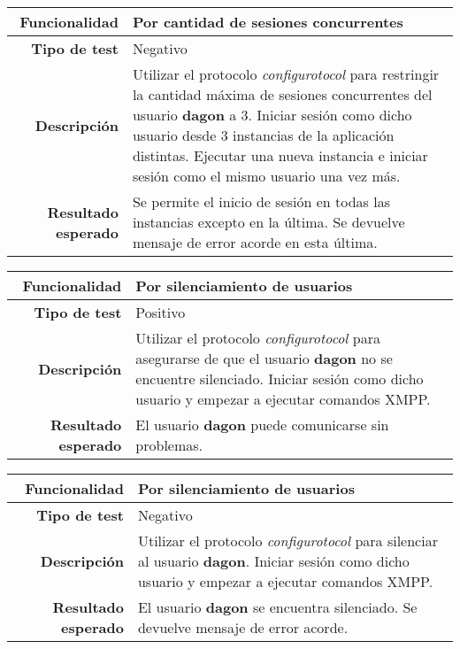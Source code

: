 \documentclass[a4paper,10pt]{article}
\begin{document}
\begin{center}
  \begin{tabular}{|r|p{12.5cm}|}
    \hline
    \textbf{Funcionalidad}	&	Por cantidad de sesiones concurrentes\\
    \hline
    \textbf{Tipo de test}	&	Negativo\\
    \hline
    \textbf{Descripción}	&	Utilizar el protocolo \textit{configurotocol} para restringir la cantidad
					máxima de sesiones concurrentes del usuario \textbf{dagon} a 3.
					Iniciar sesión como dicho usuario desde 3 instancias de la aplicación
					distintas. Ejecutar una nueva instancia e iniciar sesión como el mismo
					usuario una vez más.\\
    \hline
    \textbf{Resultado esperado}	&	Se permite el inicio de sesión en todas las instancias excepto en la última.
					Se devuelve mensaje de error acorde en esta última.\\
    \hline   
  \end{tabular}
\end{center}

\begin{center}
  \begin{tabular}{|r|p{12.5cm}|}
    \hline
    \textbf{Funcionalidad}	&	Por silenciamiento de usuarios\\
    \hline
    \textbf{Tipo de test}	&	Positivo\\
    \hline
    \textbf{Descripción}	&	Utilizar el protocolo \textit{configurotocol} para asegurarse de que el usuario
					\textbf{dagon} no se encuentre silenciado. Iniciar sesión como dicho
					usuario y empezar a ejecutar comandos XMPP.\\
    \hline
    \textbf{Resultado esperado}	&	El usuario \textbf{dagon} puede comunicarse sin problemas.\\
    \hline   
  \end{tabular}
\end{center}

\begin{center}
  \begin{tabular}{|r|p{12.5cm}|}
    \hline
    \textbf{Funcionalidad}	&	Por silenciamiento de usuarios\\
    \hline
    \textbf{Tipo de test}	&	Negativo\\
    \hline
    \textbf{Descripción}	&	Utilizar el protocolo \textit{configurotocol} para silenciar al usuario
					\textbf{dagon}. Iniciar sesión como dicho usuario y empezar a ejecutar
					comandos XMPP.\\
    \hline
    \textbf{Resultado esperado}	&	El usuario \textbf{dagon} se encuentra silenciado. Se devuelve mensaje
					de error acorde.\\
    \hline   
  \end{tabular}
\end{center}
\end{document}
